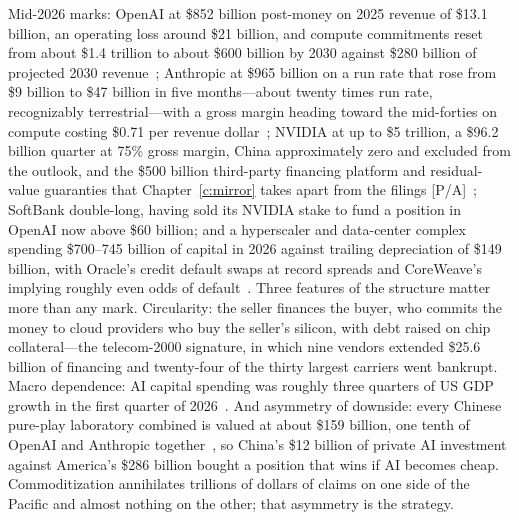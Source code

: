 Mid-2026 marks: OpenAI at \$852 billion post-money on 2025 revenue of \$13.1 billion, an operating loss around \$21 billion, and compute commitments reset from about \$1.4 trillion to about \$600 billion by 2030 against \$280 billion of projected 2030 revenue~\cite{openai-valuation,openai-reset}; Anthropic at \$965 billion on a run rate that rose from \$9 billion to \$47 billion in five months---about twenty times run rate, recognizably terrestrial---with a gross margin heading toward the mid-forties on compute costing \$0.71 per revenue dollar~\cite{anthropic-series-h,anthropic-margin}; NVIDIA at up to \$5 trillion, a \$96.2 billion quarter at 75\% gross margin, China approximately zero and excluded from the outlook, and the \$500 billion third-party financing platform and residual-value guaranties that Chapter~\ref{c:mirror} takes apart from the filings [P/A]~\cite{nvidia-5t,nvda-500b,nvda-q2fy27}; SoftBank double-long, having sold its NVIDIA stake to fund a position in OpenAI now above \$60 billion; and a hyperscaler and data-center complex spending \$700--745 billion of capital in 2026 against trailing depreciation of \$149 billion, with Oracle's credit default swaps at record spreads and CoreWeave's implying roughly even odds of default~\cite{capex-2026,oracle-cds}. Three features of the structure matter more than any mark. Circularity: the seller finances the buyer, who commits the money to cloud providers who buy the seller's silicon, with debt raised on chip collateral---the telecom-2000 signature, in which nine vendors extended \$25.6 billion of financing and twenty-four of the thirty largest carriers went bankrupt. Macro dependence: AI capital spending was roughly three quarters of US GDP growth in the first quarter of 2026~\cite{gdp-ai}. And asymmetry of downside: every Chinese pure-play laboratory combined is valued at about \$159 billion, one tenth of OpenAI and Anthropic together~\cite{datagravity}, so China's \$12 billion of private AI investment against America's \$286 billion bought a position that wins if AI becomes cheap. Commoditization annihilates trillions of dollars of claims on one side of the Pacific and almost nothing on the other; that asymmetry is the strategy.

